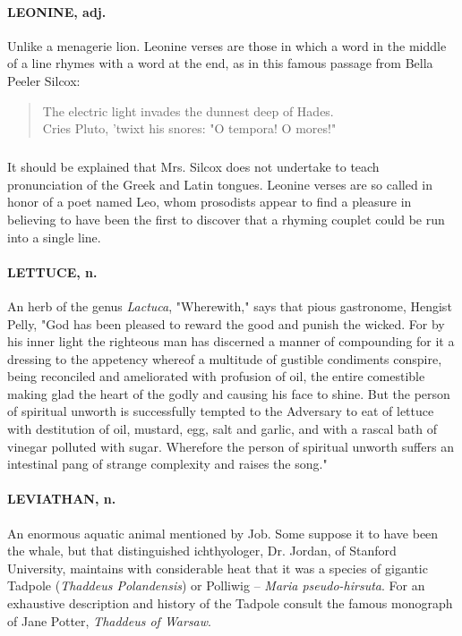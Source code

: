 \documentclass[11pt]{article}
\begin{document}
\paragraph{LEONINE, adj.}  Unlike a menagerie lion.  Leonine verses are those in
which a word in the middle of a line rhymes with a word at the end, as
in this famous passage from Bella Peeler Silcox:

\begin{quote}   The electric light invades the dunnest deep of Hades. \\
  Cries Pluto, 'twixt his snores:  "O tempora! O mores!"
\end{quote}
  
\subparagraph{}  It should be explained that Mrs. Silcox does not undertake to
teach pronunciation of the Greek and Latin tongues.  Leonine verses
are so called in honor of a poet named Leo, whom prosodists appear to
find a pleasure in believing to have been the first to discover that a
rhyming couplet could be run into a single line.

\paragraph{LETTUCE, n.}  An herb of the genus {\em Lactuca}, "Wherewith," says that
pious gastronome, Hengist Pelly, "God has been pleased to reward the
good and punish the wicked.  For by his inner light the righteous man
has discerned a manner of compounding for it a dressing to the
appetency whereof a multitude of gustible condiments conspire, being
reconciled and ameliorated with profusion of oil, the entire
comestible making glad the heart of the godly and causing his face to
shine.  But the person of spiritual unworth is successfully tempted to
the Adversary to eat of lettuce with destitution of oil, mustard, egg,
salt and garlic, and with a rascal bath of vinegar polluted with
sugar.  Wherefore the person of spiritual unworth suffers an
intestinal pang of strange complexity and raises the song."

\paragraph{LEVIATHAN, n.}  An enormous aquatic animal mentioned by Job.  Some
suppose it to have been the whale, but that distinguished
ichthyologer, Dr. Jordan, of Stanford University, maintains with
considerable heat that it was a species of gigantic Tadpole ({\em Thaddeus
Polandensis}) or Polliwig -- {\em Maria pseudo-hirsuta}.  For an
exhaustive description and history of the Tadpole consult the famous
monograph of Jane Potter, {\em Thaddeus of Warsaw}.
\end{document}
